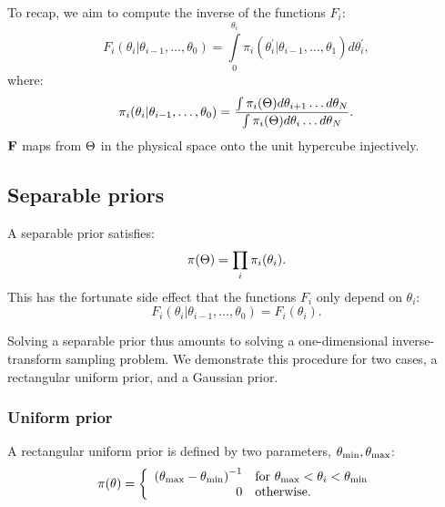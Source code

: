 To recap, we aim to compute the inverse of the functions $F_i$: 
\begin{equation}
  F_i(\theta_i|\theta_{i-1},\ldots,\theta_0) = \int\limits_0^{\theta_i} \pi_i(\theta_i^\prime|\theta_{i-1},\ldots,\theta_1) d\theta_i^\prime,
  \label{eqn:pc:appFi}
\end{equation}
%
where:
%
\begin{equation}
  \pi_i(\theta_i|\theta_{i-1},\ldots,\theta_0) 
  =
  \frac{%
    \int \pi_i(\params) d\theta_{i+1}\ldots d\theta_{N}
  }{%
    \int \pi_i(\params) d\theta_{i}\ldots d\theta_{N}
  }.
  \label{eqn:pc:apppii}
\end{equation}
$\mathbf{F}$ maps from $\Theta$ in the physical space onto the unit hypercube injectively. 



\subsection{Separable priors}
\label{sec:pc:separable_priors}
A separable prior satisfies:
\begin{equation}
  \pi(\Theta) = \prod_i\pi_i(\theta_i).
  \label{eqn:pc:separability}
\end{equation}
This has the fortunate side effect that the functions $F_i$ only depend on $\theta_i$:
\begin{equation}
  F_i(\theta_i|\theta_{i-1},\ldots,\theta_0) = F_i(\theta_i).
\end{equation}

Solving a separable prior thus amounts to solving a one-dimensional inverse-transform sampling problem. We demonstrate this procedure for two cases, a rectangular uniform prior, and a Gaussian prior.

\subsubsection{Uniform prior}
\label{sec:pc:uniform_prior}
\newcommand{\thetamin}{\theta_\smin} %
\newcommand{\thetamax}{\theta_\smax} %
A rectangular uniform prior is defined by two parameters, ${\thetamin,\thetamax}$:
\begin{equation}
  \pi(\theta) = 
  \left\{
    \begin{array}{rl}
      {(\thetamax - \thetamin)}^{-1} 
      &
      \text{for }\thetamax<\theta_i<\thetamin \\
      0 & \text{otherwise.}
    \end{array}
  \right.
\label{eqn:pc:uniform_prior}
\end{equation}

